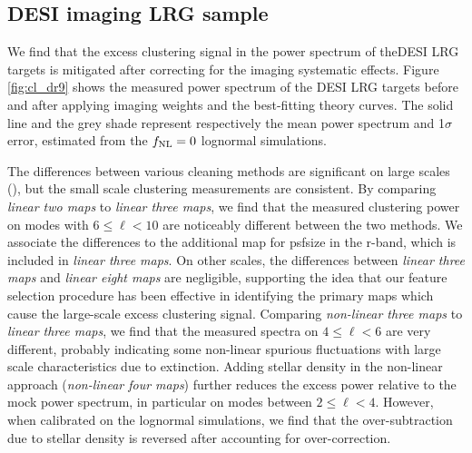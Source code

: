 \subsection{DESI imaging LRG sample}
We find that the excess clustering signal in the power spectrum of the\mr DESI LRG targets is mitigated after correcting for the imaging systematic effects. Figure \ref{fig:cl_dr9} shows the measured power spectrum of the DESI LRG targets before and after applying imaging weights and the best-fitting theory curves. The solid line and the grey shade represent respectively the mean power spectrum and 1$\sigma$ error, estimated from the $f_{\rm NL}=0$ lognormal simulations. 



The differences between various cleaning methods are significant on large scales (), but the small scale clustering measurements are consistent. By comparing \textit{linear two maps} to \textit{linear three maps}, we find that the measured clustering power on modes with $6\leq \ell < 10$ are noticeably different between the two methods. We associate the differences to the additional map for psfsize in the r-band, which is included in \textit{linear three maps}. On other scales, the differences between \textit{linear three maps} and \textit{linear eight maps} are negligible, supporting the idea that our feature selection procedure has been effective in identifying the primary maps which cause the large-scale excess clustering signal. Comparing \textit{non-linear three maps} to \textit{linear three maps}, we find that the measured spectra on $4 \leq \ell < 6$ are very different, probably indicating some non-linear spurious fluctuations with large scale characteristics due to extinction. Adding stellar density in the non-linear approach (\textit{non-linear four maps}) further reduces the excess power relative to the mock power spectrum, in particular on modes between $2\leq \ell < 4$. However, when calibrated on the lognormal simulations, we find that the over-subtraction due to stellar density is reversed after accounting for over-correction.


